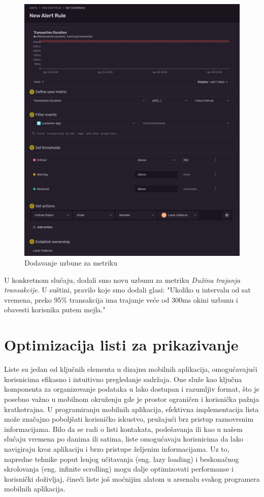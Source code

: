 \documentclass[12pt,oneside]{memoir}
\begin{document}
\begin{figure}
    \centering
    \includegraphics[scale=0.3]{docs/images/chapterFive/addRule.png}
    \caption{Dodavanje uzbune za metriku}
    \label{fig:addRuleForMetric}
\end{figure}

U konkretnom slučaju, dodali smo novu uzbunu za metriku \textit{Dužina trajanja transakcije}. U suštini, pravilo koje smo dodali glasi: "Ukoliko u intervalu od sat vremena, preko 95\% transakcija ima trajanje veće od 300ms okini uzbunu i obavesti korisnika putem mejla."

\section{Optimizacija listi za prikazivanje}

Liste su jedan od ključnih elementa u dizajnu mobilnih aplikacija, omogućavajući korisnicima efikasno i intuitivno pregledanje sadržaja. One služe kao ključna komponenta za organizovanje podataka u lako dostupan i razumljiv format, što je posebno važno u mobilnom okruženju gde je prostor ograničen i korisnička pažnja kratkotrajna. U programiranju mobilnih aplikacija, efektivna implementacija lista može značajno poboljšati korisničko iskustvo, pružajući brz pristup raznovrsnim informacijama. Bilo da se radi o listi kontakata, podešavanja ili kao u našem slučaju vremena po danima ili satima, liste omogućavaju korisnicima da lako navigiraju kroz aplikaciju i brzo pristupe željenim informacijama. Uz to, napredne tehnike poput lenjog učitavanja (eng. lazy loading) i beskonačnog skrolovanja (eng. infinite scrolling) mogu dalje optimizovati performanse i korisnički doživljaj, čineći liste još moćnijim alatom u arsenalu svakog programera mobilnih aplikacija.
\end{document}
